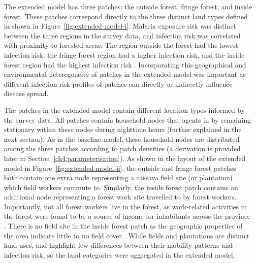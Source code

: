 The extended model has three patches: the outside forest, fringe forest, and inside forest. These patches correspond directly to the three distinct land types defined in \citet{sandfort_forest_2020} shown in Figure~\ref{fig:extended-model-i}. Malaria exposure risk was distinct between the three regions in the survey data, and infection risk was correlated with proximity to forested areas: The region outside the forest had the lowest infection risk, the fringe forest region had a higher infection risk, and the inside forest region had the highest infection risk \cite{pepey_mobility_2022, vantaux_anopheles_2021, sandfort_forest_2020}. Incorporating this geographical and environmental heterogeneity of patches in the extended model was important as different infection risk profiles of patches can directly or indirectly influence disease spread.


The patches in the extended model contain different location types informed by the survey data. All patches contain household nodes that agents  in by remaining stationary within these nodes during nighttime hours (further explained in the next section). As in the baseline model, these household nodes are distributed among the three patches according to patch densities (a derivation is provided later in Section~\ref{ch4:parameterisation}). As shown in the layout of the extended model in Figure~\ref{fig:extended-model-ii}, the outside and fringe forest patches both contain one extra node representing a cassava field site (or plantation) which field workers commute to. Similarly, the inside forest patch contains an additional node representing a forest work site travelled to by forest workers. Importantly, not all forest workers live in the forest, as work-related activities in the forest were found to be a source of income for inhabitants across the province \cite{sandfort_forest_2020, pepey_mobility_2022}. There is no field site in the inside forest patch as the geographic properties of the area indicate little to no field cover \cite{sandfort_forest_2020}. While fields and plantations are distinct land uses, \citet{sandfort_forest_2020} and \citet{vantaux_anopheles_2021} highlight few differences between their mobility patterns and infection risk, so the land categories were aggregated in the extended model.

